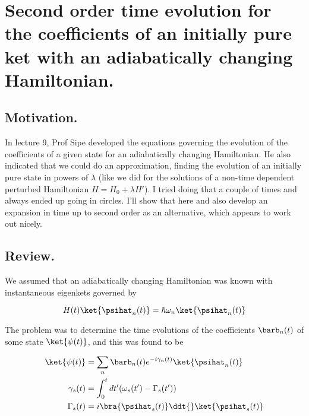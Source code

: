 
%

\chapter{Second order time evolution for the coefficients of an initially pure ket with an adiabatically changing Hamiltonian.}
\label{chap:adiabaticApprox}
{}
\date{Nov 11, 2011}

\beginArtWithToc

\section{Motivation.}

In lecture 9, Prof Sipe developed the equations governing the evolution of the coefficients of a given state for an adiabatically changing Hamiltonian.  He also indicated that we could do an approximation, finding the evolution of an initially pure state in powers of $\lambda$ (like we did for the solutions of a non-time dependent perturbed Hamiltonian $H = H_0 + \lambda H'$).  I tried doing that a couple of times and always ended up going in circles.  I'll show that here and also develop an expansion in time up to second order as an alternative, which appears to work out nicely.

\section{Review.}

We assumed that an adiabatically changing Hamiltonian was known with instantaneous eigenkets governed by

\begin{equation}\label{eqn:adiabaticApprox:10}
H(t) \ket{\psihat_n(t)} = \hbar \omega_n \ket{\psihat_n(t)} 
\end{equation}

The problem was to determine the time evolutions of the coefficients $\barb_n(t)$ of some state $\ket{\psi(t)}$, and this was found to be

\begin{align}\label{eqn:adiabaticApprox:30}
\ket{\psi(t)} &= \sum_n \barb_n(t) e^{-i \gamma_n(t)} \ket{\psihat_n(t)} \\
\gamma_s(t) &= \int_0^t dt' (\omega_s(t') - \Gamma_s(t')) \\
\Gamma_s(t) &= i \bra{\psihat_s(t)} \ddt{} \ket{\psihat_s(t)} 
\end{align}

